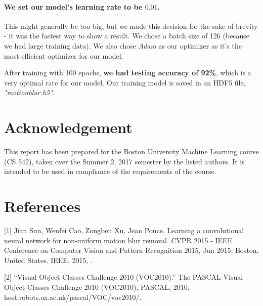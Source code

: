 \documentclass{article}
\begin{document}
\paragraph{We set our model's learning rate to be $0.01$.} This might generally be too 
big, but we made this decision for the sake of brevity - it was the fastest way to show 
a result. We chose a batch size of 126 (because we had large training data). We also 
chose \textit{Adam} as our optimizer as it's the most efficient optimizer for our model.

After training with 100 epochs, \textbf{we had testing accuracy of 92\%}, which is a 
very optimal rate for our model. Our training model is saved in an HDF5 file, 
\textit{"motionblur.h5"}.  

\section*{Acknowledgement}
This report has been prepared for the Boston University Machine Learning course (CS 542), 
taken over the Summer 2, 2017 semester by the listed authors. It is intended to be used 
in compliance of the requirements of the course. 

\section*{References}
\medskip
\small

[1] Jian Sun, Wenfei Cao, Zongben Xu, Jean Ponce. Learning a convolutional neural network 
for non-uniform motion blur removal. CVPR 2015 - IEEE Conference on Computer Vision and 
Pattern Recognition 2015, Jun 2015, Boston, United States. IEEE, 2015, .

[2] “Visual Object Classes Challenge 2010 (VOC2010).” The PASCAL Visual Object Classes 
Challenge 2010 (VOC2010), PASCAL, 2010, host.robots.ox.ac.uk/pascal/VOC/voc2010/.
\end{document}
